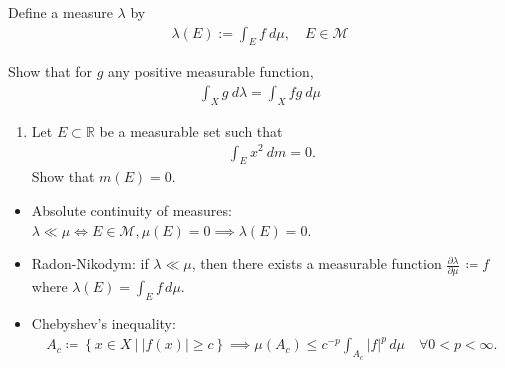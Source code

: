 Define a measure \(\lambda\) by
\begin{align*}
\lambda(E):=\int_{E} f ~d \mu, \quad E \in \mathcal{M}
\end{align*}

Show that for \(g\) any positive measurable function,
\begin{align*}
\int_{X} g ~d \lambda=\int_{X} f g ~d \mu
\end{align*}

\begin{enumerate}
\def\labelenumi{\alph{enumi}.}
\setcounter{enumi}{1}
\tightlist
\item
  Let \(E \subset {\mathbb{R}}\) be a measurable set such that
  \begin{align*}
  \int_{E} x^{2} ~d m=0.
  \end{align*}
  Show that \(m(E) = 0\).
\end{enumerate}

\begin{concept}

\envlist

\begin{itemize}
\tightlist
\item
  Absolute continuity of measures:
  \(\lambda \ll \mu \iff E\in\mathcal{M}, \mu(E) = 0 \implies \lambda(E) = 0\).
\item
  Radon-Nikodym: if \(\lambda \ll \mu\), then there exists a measurable
  function \({\frac{\partial \lambda}{\partial \mu}\,} \coloneqq f\)
  where \(\lambda(E) = \int_E f \,d\mu\).
\item
  Chebyshev's inequality:
  \begin{align*}  
  A_c \coloneqq\left\{{ x\in X {~\mathrel{\Big|}~}{\left\lvert {f(x)} \right\rvert} \geq c  }\right\} \implies \mu(A_c) \leq c^{-p} \int_{A_c} {\left\lvert {f} \right\rvert}^p \,d\mu \quad \forall 0 < p < \infty
  .\end{align*}
\end{itemize}

\end{concept}

